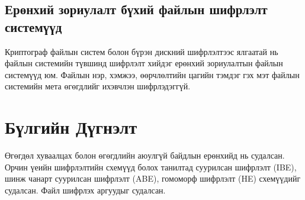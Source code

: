 \subsection*{Ерөнхий зориулалт бүхий файлын шифрлэлт системүүд}

Криптограф файлын систем болон бүрэн дискний шифрлэлтээс ялгаатай нь файлын системийн түвшинд шифрлэлт хийдэг ерөнхий зориулалтын файлын системүүд юм. Файлын нэр, хэмжээ, өөрчлөлтийн цагийн тэмдэг гэх мэт файлын системийн мета өгөгдлийг ихэвчлэн шифрлэдэггүй.


\section{Бүлгийн Дүгнэлт}
Өгөгдөл хуваалцах болон өгөгдлийн аюулгүй байдлын ерөнхийд нь судалсан. Орчин үеийн шифрлэлтийн схемүүд болох танилтад суурилсан шифрлэлт (IBE), шинж чанарт суурилсан шифрлэлт (ABE), гомоморф шифрлэлт (HE) схемүүдийг судалсан. Файл шифрлэх аргуудыг судалсан.